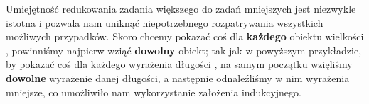 Umiejętność redukowania zadania większego do zadań mniejszych jest niezwykle istotna i pozwala nam uniknąć niepotrzebnego rozpatrywania wszystkich możliwych przypadków. Skoro chcemy pokazać coś dla \textbf{każdego} obiektu wielkości , powinniśmy najpierw wziąć \textbf{dowolny} obiekt; tak jak w powyższym przykładzie, by pokazać coś dla każdego wyrażenia długości , na samym początku wzięliśmy \textbf{dowolne} wyrażenie danej długości, a następnie odnaleźliśmy w nim wyrażenia mniejsze, co umożliwiło nam wykorzystanie założenia indukcyjnego.